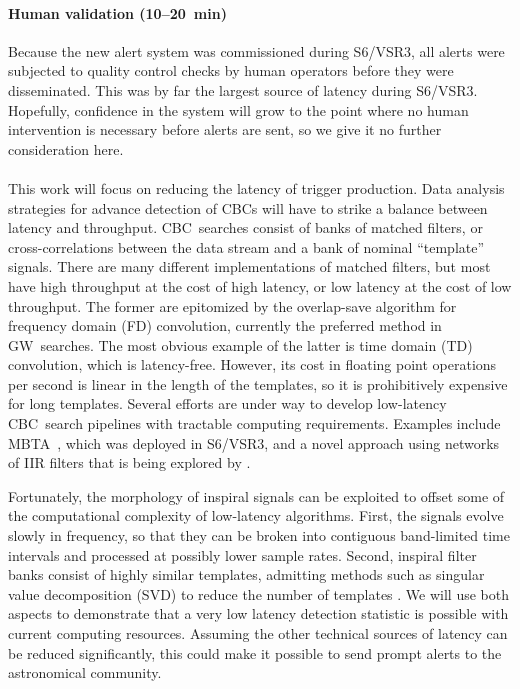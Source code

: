 \documentclass[preprint2]{aastex}
\newcommand{\mbta}{MBTA}
\newcommand{\GW}{GW}%
\newcommand{\CBC}{CBC}%
\newcommand{\SVD}{SVD}%
\newcommand{\TD}{TD}%
\newcommand{\FD}{FD}%
\begin{document}
\paragraph{Human validation (10--20~min)}%
Because the new alert system was commissioned during S6/VSR3, all alerts were
subjected to quality control checks by human operators before they were
disseminated. This was by far the largest source of latency during S6/VSR3.
Hopefully, confidence in the system will grow to the point where no human
intervention is necessary before alerts are sent, so we give it no further
consideration here.

\paragraph{}

This work will focus on reducing the latency of trigger production.  Data
analysis strategies for advance detection of \CBC{}s will have to strike a
balance between latency and throughput. \CBC\ searches consist of banks of
matched filters, or cross-correlations between the data stream and a bank of
nominal ``template'' signals.  There are many different implementations of
matched filters, but most have high throughput at the cost of high latency, or
low latency at the cost of low throughput.  The former are epitomized by the
overlap-save algorithm for frequency domain (\FD) convolution, currently the
preferred method in \GW\ searches.  The most obvious example of the latter is
time domain (\TD) convolution, which is latency-free.  However, its cost in floating
point operations per second is linear in the length of the templates, so it is
prohibitively expensive for long templates.  Several efforts are under way to
develop low-latency \CBC\ search pipelines with tractable computing requirements.
Examples include \mbta{}~\citep{Marion2004, Buskulic2010}, which was deployed in
S6/VSR3, and a novel approach using networks of IIR filters that is being explored
by \citet{shaunIIR, linqingIIR}.

Fortunately, the morphology of inspiral signals can be exploited to offset some
of the computational complexity of low-latency algorithms.  First, the signals
evolve slowly in frequency, so that they can be broken into contiguous
band-limited time intervals and processed at possibly lower sample rates.
Second, inspiral filter banks consist of highly similar templates, admitting
methods such as singular value decomposition (\SVD) to reduce the number of
templates \citep{Cannon:2010p10398}. We will use both aspects to demonstrate
that a very low latency detection statistic is possible with current computing
resources.  Assuming the other technical sources of latency can be reduced
significantly, this could make it possible to send prompt alerts to the
astronomical community.
\end{document}
